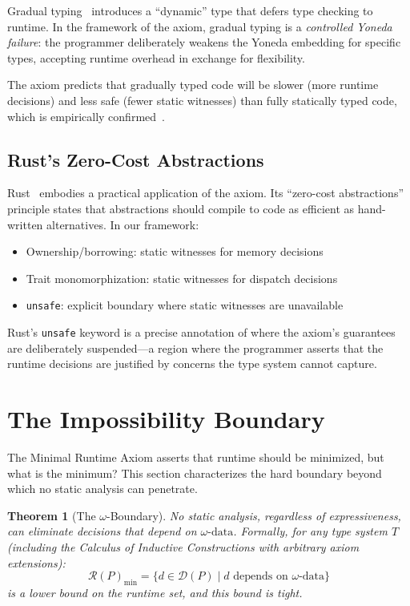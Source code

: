 \documentclass[11pt]{article}
\newtheorem{theorem}{Theorem}[section]
\newcommand{\DP}{\mathcal{D}(P)}
\newcommand{\RP}{\mathcal{R}(P)}
\newcommand{\omegadata}{\omega\text{-data}}
\begin{document}
Gradual typing~\cite{siek2006gradual} introduces a ``dynamic'' type that defers type
checking to runtime. In the framework of the axiom, gradual typing is a \emph{controlled
Yoneda failure}: the programmer deliberately weakens the Yoneda embedding for specific
types, accepting runtime overhead in exchange for flexibility.

The axiom predicts that gradually typed code will be slower (more runtime decisions) and
less safe (fewer static witnesses) than fully statically typed code, which is empirically
confirmed~\cite{takikawa2016gradual}.

\subsection{Rust's Zero-Cost Abstractions}

Rust~\cite{matsakis2014rust} embodies a practical application of the axiom. Its
``zero-cost abstractions'' principle states that abstractions should compile to code as
efficient as hand-written alternatives. In our framework:
\begin{itemize}[nosep]
  \item Ownership/borrowing: static witnesses for memory decisions
  \item Trait monomorphization: static witnesses for dispatch decisions
  \item \texttt{unsafe}: explicit boundary where static witnesses are unavailable
\end{itemize}

Rust's \texttt{unsafe} keyword is a precise annotation of where the axiom's guarantees
are deliberately suspended---a region where the programmer asserts that the runtime
decisions are justified by concerns the type system cannot capture.


\section{The Impossibility Boundary}
\label{sec:impossibility}

The Minimal Runtime Axiom asserts that runtime should be minimized, but what is the
minimum? This section characterizes the hard boundary beyond which no static analysis
can penetrate.

\begin{theorem}[The $\omega$-Boundary]
\label{thm:omega-boundary}
No static analysis, regardless of expressiveness, can eliminate decisions that depend
on $\omegadata$. Formally, for any type system $T$ (including the Calculus of Inductive
Constructions with arbitrary axiom extensions):
\[
  \RP_{\min} = \{ d \in \DP \mid d \text{ depends on } \omegadata \}
\]
is a lower bound on the runtime set, and this bound is tight.
\end{theorem}
\end{document}
